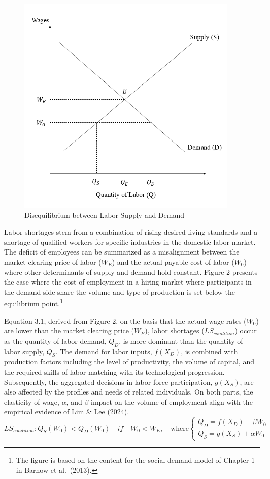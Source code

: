 \documentclass[
  12pt,
]{article}
\begin{document}
\begin{figure}
\centering
\includegraphics[width=4.16667in,height=\textheight,keepaspectratio]{lbs.png}
\caption{Disequilibrium between Labor Supply and Demand}
\end{figure}

Labor shortages stem from a combination of rising desired living
standards and a shortage of qualified workers for specific industries in
the domestic labor market. The deficit of employees can be summarized as
a misalignment between the market-clearing price of labor (\(W_E\)) and
the actual payable cost of labor (\(W_0\)) where other determinants of
supply and demand hold constant. Figure 2 presents the case where the
cost of employment in a hiring market where participants in the demand
side share the volume and type of production is set below the
equilibrium point.\footnote{The figure is based on the content for the
  social demand model of Chapter 1 in Barnow et al.~(2013).}

Equation 3.1, derived from Figure 2, on the basis that the actual wage
rates (\(W_0\)) are lower than the market clearing price (\(W_E\)),
labor shortages (\(LS_{condition}\)) occur as the quantity of labor
demand, \(Q_D\), is more dominant than the quantity of labor supply,
\(Q_S\). The demand for labor inputs, \(f(X_D)\), is combined with
production factors including the level of productivity, the volume of
capital, and the required skills of labor matching with its
technological progression. Subsequently, the aggregated decisions in
labor force participation, \(g(X_S)\), are also affected by the profiles
and needs of related individuals. On both parts, the elasticity of wage,
\(\alpha\), and \(\beta\) impact on the volume of employment align with
the empirical evidence of Lim \& Lee (2024).\\
\[
LS_{condition}: Q_S(W_0) < Q_D(W_0)\quad if \quad W_0 < W_E, \quad \text{where}
\begin{cases}
Q_D = f(X_D)-\beta W_0 \\
Q_S = g(X_S)+\alpha W_0
\end{cases}
\tag{3.1}
\]
\end{document}
